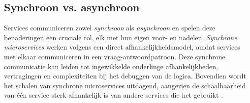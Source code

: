 
\bigskip
 



 
\subsection{Synchroon vs. asynchroon}
Services communiceren zowel \emph{synchroon} als \emph{asynchroon} en spelen deze benaderingen een cruciale rol, 
elk met hun eigen voor- en nadelen. \emph{Synchrone microservices} werken volgens een direct 
afhankelijkheidsmodel, omdat services met elkaar communiceren in een vraag-antwoordpatroon. 
Deze synchrone communicatie kan leiden tot ingewikkelde onderlinge afhankelijkheden, vertragingen en complexiteiten bij het debuggen 
van de logica. Bovendien wordt het schalen van synchrone microservices uitdagend, 
aangezien de schaalbaarheid van één service sterk afhankelijk is van andere services die het gebruikt \autocite{Bellemare2020}. 
\newline


